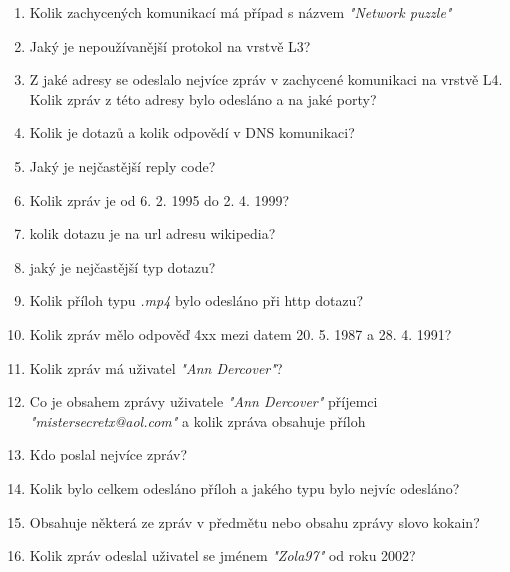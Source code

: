            \begin{enumerate}
                \item Kolik zachycených komunikací má případ s názvem \textit{"Network puzzle"}

                \item Jaký je nepoužívanější protokol na vrstvě L3?

                \item Z jaké adresy se odeslalo nejvíce zpráv v zachycené komunikaci na vrstvě L4. Kolik zpráv z této adresy bylo odesláno a na jaké porty?

                \item Kolik je dotazů a kolik odpovědí v DNS komunikaci?
                \item Jaký je nejčastější reply code?
                \item Kolik zpráv je od 6. 2. 1995 do 2. 4. 1999?

                \item kolik dotazu je na url adresu wikipedia?
                \item jaký je nejčastější typ dotazu?
                \item Kolik příloh typu \textit{.mp4} bylo odesláno při http dotazu?

                \item Kolik zpráv mělo odpověď 4xx mezi datem 20. 5. 1987 a 28. 4. 1991?

                \item Kolik zpráv má uživatel \textit{"Ann Dercover"}?
                \item Co je obsahem zprávy uživatele \textit{"Ann Dercover"} příjemci \textit{"mistersecretx@aol.com"} a kolik zpráva obsahuje příloh
                \item Kdo poslal nejvíce zpráv?
                \item Kolik bylo celkem odesláno příloh a jakého typu bylo nejvíc odesláno?
                \item Obsahuje některá ze zpráv v předmětu nebo obsahu zprávy slovo kokain?
                \item Kolik zpráv odeslal uživatel se jménem \textit{"Zola97"} od roku 2002?
                
            \end{enumerate}
    
